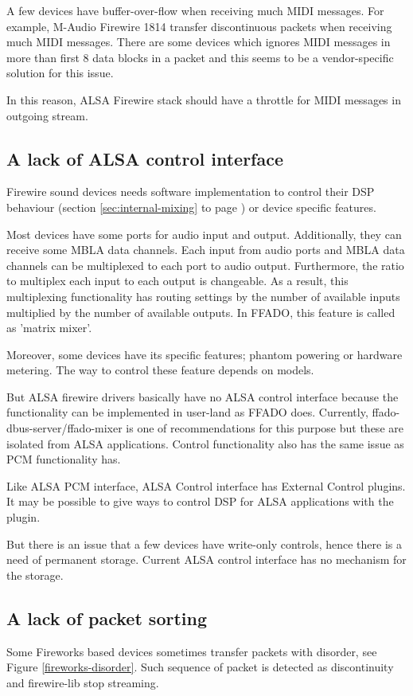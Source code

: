 \documentclass[onecolumn]{article}
\begin{document}
A few devices have buffer-over-flow when receiving much MIDI messages. For example, M-Audio Firewire 1814 transfer discontinuous packets when receiving much MIDI messages. There are some devices which ignores MIDI messages in more than first 8 data blocks in a packet and this seems to be a vendor-specific solution for this issue.

In this reason, ALSA Firewire stack should have a throttle for MIDI messages in outgoing stream.

\subsection{A lack of ALSA control interface}

Firewire sound devices needs software implementation to control their DSP behaviour (section \ref{sec:internal-mixing} to page \pageref{sec:internal-mixing}) or device specific features.

Most devices have some ports for audio input and output. Additionally, they can receive some MBLA data channels. Each input from audio ports and MBLA data channels can be multiplexed to each port to audio output. Furthermore, the ratio to multiplex each input to each output is changeable. As a result, this multiplexing functionality has routing settings by the number of available inputs multiplied by the number of available outputs. In FFADO, this feature is called as 'matrix mixer'.

Moreover, some devices have its specific features; phantom powering or hardware metering. The way to control these feature depends on models.

But ALSA firewire drivers basically have no ALSA control interface because the functionality can be implemented in user-land as FFADO does. Currently, ffado-dbus-server/ffado-mixer is one of recommendations for this purpose but these are isolated from ALSA applications. Control functionality also has the same issue as PCM functionality has.

Like ALSA PCM interface, ALSA Control interface has External Control plugins. It may be possible to give ways to control DSP for ALSA applications with the plugin.

But there is an issue that a few devices have write-only controls, hence there is a need of permanent storage. Current ALSA control interface has no mechanism for the storage.

\subsection{A lack of packet sorting}
Some Fireworks based devices sometimes transfer packets with disorder, see Figure \ref{fireworks-disorder}. Such sequence of packet is detected as discontinuity and firewire-lib stop streaming.
\end{document}
